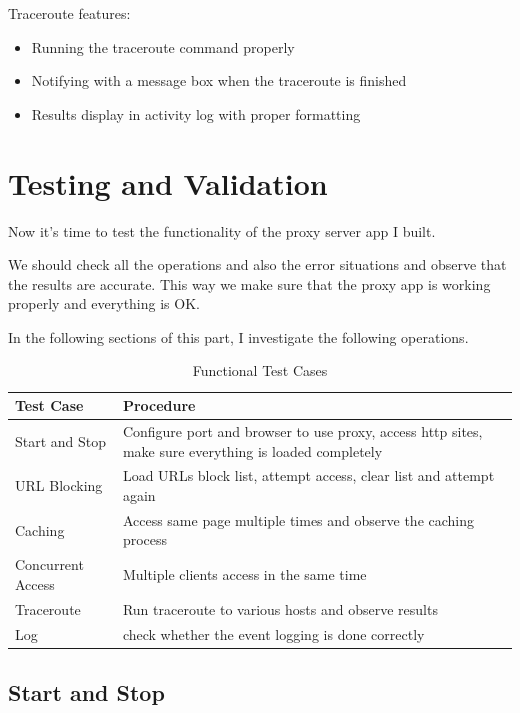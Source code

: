 \documentclass[a4paper]{article}
\begin{document}
	Traceroute features:
	\begin{itemize}
		\item Running the traceroute command properly
		\item Notifying with a message box when the traceroute is finished
		\item Results display in activity log with proper formatting
	\end{itemize}
	
	\section{Testing and Validation}
	\label{sec:testing}
	
	Now it's time to test the functionality of the proxy server app I built.
	
	We should check all the operations and also the error situations and observe that the results are accurate. This way we make sure that the proxy app is working properly and everything is OK.
	
	In the following sections of this part, I investigate the following operations.
	
	\begin{table}[!h]
		\centering
		\begin{tabularx}{\textwidth}{XX}
			\toprule
			\textbf{Test Case} & \textbf{Procedure} \\
			\midrule
			Start and Stop & Configure port and browser to use proxy, access http sites, make sure everything is loaded completely \\
			URL Blocking & Load URLs block list, attempt access, clear list and attempt again\\
			Caching & Access same page multiple times and observe the caching process\\
			Concurrent Access & Multiple clients access in the same time \\
			Traceroute & Run traceroute to various hosts and observe results \\
			Log & check whether the event logging is done correctly \\
			\bottomrule
		\end{tabularx}
		\caption{Functional Test Cases}
	\end{table}
	
	\subsection{Start and Stop}
	
\end{document}
